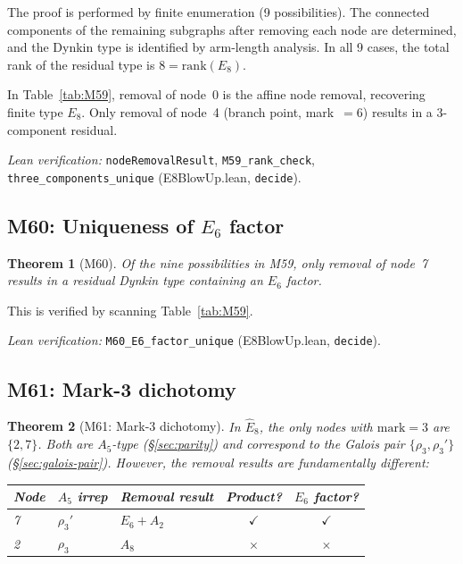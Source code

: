 \documentclass[sn-mathphys-num,Numbered]{sn-jnl}
\theoremstyle{thmstyleone}
\newtheorem{theorem}{Theorem}[section]
\theoremstyle{thmstylethree}
\newcommand{\Ehat}{\hat{E}}
\newcommand{\rank}{\mathrm{rank}}
\begin{document}
The proof is performed by finite enumeration (9 possibilities).  The connected
components of the remaining subgraphs after removing each node are determined,
and the Dynkin type is identified by arm-length analysis.  In all 9 cases, the
total rank of the residual type is $8 = \rank(E_8)$.

In Table~\ref{tab:M59}, removal of node~0 is the affine node removal,
recovering finite type $E_8$.  Only removal of node~4 (branch point, mark~$= 6$)
results in a 3-component residual.

\noindent\textit{Lean verification:}
\texttt{nodeRemovalResult}, \texttt{M59\_rank\_check},
\texttt{three\_components\_unique} (E8BlowUp.lean, \texttt{decide}).


\subsection{M60: Uniqueness of $E_6$ factor}\label{sec:M60}

\begin{theorem}[M60]\label{thm:M60}
Of the nine possibilities in M59, only removal of node~7 results in a residual
Dynkin type containing an $E_6$ factor.
\end{theorem}

This is verified by scanning Table~\ref{tab:M59}.

\noindent\textit{Lean verification:}
\texttt{M60\_E6\_factor\_unique} (E8BlowUp.lean, \texttt{decide}).


\subsection{M61: Mark-3 dichotomy}\label{sec:M61}

\begin{theorem}[M61: Mark-3 dichotomy]\label{thm:M61}
In $\Ehat_8$, the only nodes with $\mathrm{mark} = 3$ are $\{2, 7\}$.  Both
are $A_5$-type (\S\ref{sec:parity}) and correspond to the Galois pair
$\{\rho_3, \rho_3'\}$ (\S\ref{sec:galois-pair}).  However, the removal
results are fundamentally different:
\begin{center}
\begin{tabular}{lllcc}
\toprule
Node & $A_5$ irrep & Removal result & Product? & $E_6$ factor? \\
\midrule
7 & $\rho_3'$ & $E_6 + A_2$ & $\checkmark$ & $\checkmark$ \\
2 & $\rho_3$  & $A_8$        & $\times$     & $\times$ \\
\bottomrule
\end{tabular}
\end{center}
\end{theorem}
\end{document}
